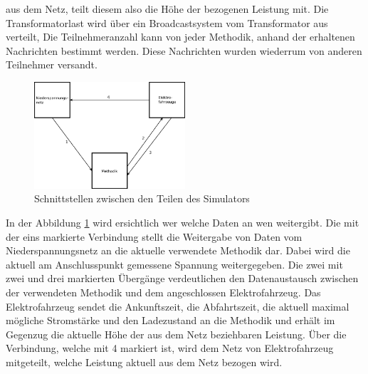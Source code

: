 aus dem Netz, teilt diesem also die Höhe der bezogenen Leistung mit. Die Transformatorlast wird über ein Broadcastsystem vom Transformator aus verteilt, Die Teilnehmeranzahl kann von jeder Methodik, anhand der erhaltenen Nachrichten bestimmt werden. Diese Nachrichten wurden wiederrum von anderen Teilnehmer versandt.\\
\begin{figure}[htb]
\centering
	\includegraphics[width=0.5\textwidth]{img/SimAufbau1.png}
	\caption{Schnittstellen zwischen den Teilen des Simulators}
	\label{Abb_SimAufbau}
\end{figure}

In der Abbildung \ref{Abb_SimAufbau} wird ersichtlich wer welche Daten an wen weitergibt. Die mit der eins markierte Verbindung stellt die Weitergabe von Daten  vom Niederspannungsnetz an die aktuelle verwendete Methodik dar. Dabei wird die aktuell am Anschlusspunkt gemessene Spannung weitergegeben. Die zwei mit zwei und drei markierten Übergänge verdeutlichen den Datenaustausch zwischen der verwendeten Methodik und dem angeschlossen Elektrofahrzeug. Das Elektrofahrzeug sendet die Ankunftszeit, die Abfahrtszeit, die aktuell maximal mögliche Stromstärke und den Ladezustand an die Methodik und erhält im Gegenzug die aktuelle Höhe der aus dem Netz beziehbaren Leistung. Über die Verbindung, welche mit 4 markiert ist, wird dem Netz von Elektrofahrzeug mitgeteilt, welche Leistung aktuell aus dem Netz bezogen wird.
